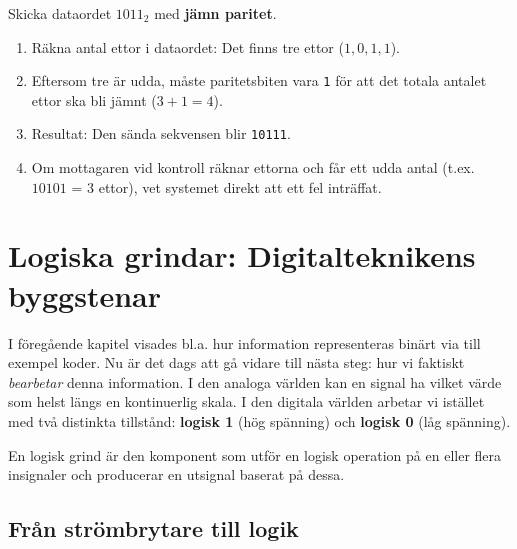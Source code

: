 \documentclass[
  swedish,
  letterpaper,
  oneside,
  openany]{book}
\providecommand{\tightlist}{%
  \setlength{\itemsep}{0pt}\setlength{\parskip}{0pt}}
\begin{document}
\begin{tcolorbox}[enhanced jigsaw, arc=.35mm, bottomrule=.15mm, bottomtitle=1mm, breakable, colback=white, colbacktitle=quarto-callout-note-color!10!white, colframe=quarto-callout-note-color-frame, coltitle=black, left=2mm, leftrule=.75mm, opacityback=0, opacitybacktitle=0.6, rightrule=.15mm, title=\textcolor{quarto-callout-note-color}{\faInfo}\hspace{0.5em}{Exempel: Feldetektering med jämn paritet}, titlerule=0mm, toprule=.15mm, toptitle=1mm]

Skicka dataordet \(1011_2\) med \textbf{jämn paritet}.

\begin{enumerate}
\def\labelenumi{\arabic{enumi}.}
\tightlist
\item
  Räkna antal ettor i dataordet: Det finns tre ettor (\(1, 0, 1, 1\)).
\item
  Eftersom tre är udda, måste paritetsbiten vara \texttt{1} för att det
  totala antalet ettor ska bli jämnt (\(3 + 1 = 4\)).
\item
  Resultat: Den sända sekvensen blir \texttt{10111}.
\item
  Om mottagaren vid kontroll räknar ettorna och får ett udda antal
  (t.ex. \(10101\) = 3 ettor), vet systemet direkt att ett fel
  inträffat.
\end{enumerate}

\end{tcolorbox}


\chapter{Logiska grindar: Digitalteknikens
byggstenar}\label{logiska-grindar-digitalteknikens-byggstenar}

I föregående kapitel visades bl.a. hur information representeras binärt
via till exempel koder. Nu är det dags att gå vidare till nästa steg:
hur vi faktiskt \emph{bearbetar} denna information. I den analoga
världen kan en signal ha vilket värde som helst längs en kontinuerlig
skala. I den digitala världen arbetar vi istället med två distinkta
tillstånd: \textbf{logisk 1} (hög spänning) och \textbf{logisk 0} (låg
spänning).

En logisk grind är den komponent som utför en logisk operation på en
eller flera insignaler och producerar en utsignal baserat på dessa.

\section{Från strömbrytare till
logik}\label{fruxe5n-struxf6mbrytare-till-logik}
\end{document}
